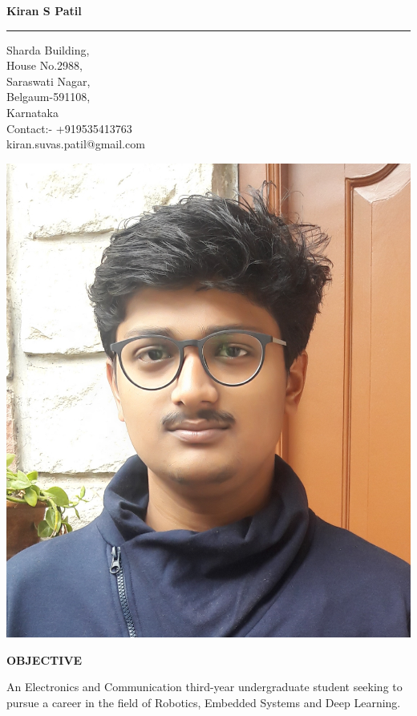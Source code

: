 \documentclass[a4paper]{article}
\begin{document}
	\begin{center}
		\huge{\textbf{Kiran S Patil}}
		\vspace{5pt}
		\hrule
	\end{center}
	\begin{minipage}{0.5\textwidth}
		Sharda Building,\\ 
		House No.2988,  \\
		Saraswati Nagar,\\
		Belgaum-591108,\\ 
		Karnataka \\
		Contact:- +919535413763\\
		kiran.suvas.patil@gmail.com\\
	\end{minipage}
	\begin{minipage}{0.5\textwidth}	
		\hspace{153pt}
		\includegraphics[scale=0.065]{image.jpg}		
	\end{minipage}

	\begin{flushleft}
		\vspace{5mm}
		\large{\textbf{OBJECTIVE}} 
		\vspace{0.5mm}
		\noindent\hrulefill
		\vspace{0.5mm}
	\end{flushleft}
	\begin{flushleft}
		An Electronics and Communication third-year undergraduate student seeking to
		pursue a career in the field of Robotics, Embedded Systems and Deep Learning.
	\end{flushleft}
\end{document}
